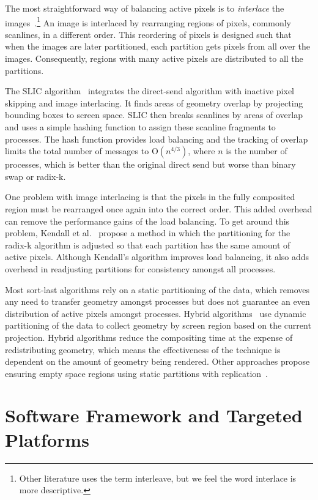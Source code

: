\documentclass{sig-alternate}
\newcommand*{\lcite}[1]{~\cite{#1}}
\newcommand*{\scite}[1]{~\cite{#1}}
\newcommand{\etal}{et al.}
\newcommand*{\keyterm}[1]{\emph{#1}}
\newcommand{\Oh}{\mathrm{O}}
\begin{document}
The most straightforward way of balancing active pixels is to
\keyterm{interlace} the
images\lcite{Molnar1994,Takeuchi2003}.\footnote{Other literature uses the
  term interleave, but we feel the word interlace is more descriptive.}  An
image is interlaced by rearranging regions of pixels, commonly scanlines,
in a different order.  This reordering of pixels is designed such that when
the images are later partitioned, each partition gets pixels from all over
the images.  Consequently, regions with many active pixels are distributed
to all the partitions.

The SLIC algorithm\lcite{SLIC} integrates the direct-send algorithm with
inactive pixel skipping and image interlacing.  It finds areas of geometry
overlap by projecting bounding boxes to screen space.  SLIC then breaks
scanlines by areas of overlap and uses a simple hashing function to assign
these scanline fragments to processes.  The hash function provides load
balancing and the tracking of overlap limits the total number of messages
to $\Oh(n^{4/3})$, where $n$ is the number of processes, which is better
than the original direct send but worse than binary swap or radix-k.

One problem with image interlacing is that the pixels in the fully
composited region must be rearranged once again into the correct order.
This added overhead can remove the performance gains of the load balancing.
To get around this problem, Kendall \etal\scite{Kendall2010} propose a
method in which the partitioning for the radix-k algorithm is adjusted so
that each partition has the same amount of active pixels.  Although
Kendall's algorithm improves load balancing, it also adds overhead in
readjusting partitions for consistency amongst all processes.

Most sort-last algorithms rely on a static partitioning of the data, which
removes any need to transfer geometry amongst processes but does not
guarantee an even distribution of active pixels amongst processes.  Hybrid
algorithms\lcite{Samanta2000} use dynamic partitioning of the data to
collect geometry by screen region based on the current projection.  Hybrid
algorithms reduce the compositing time at the expense of redistributing
geometry, which means the effectiveness of the technique is dependent on
the amount of geometry being rendered.  Other approaches propose ensuring
empty space regions using static partitions with
replication\lcite{Samanta2001}.

\section{Software Framework and Targeted Platforms}
\label{sec:TestingEnvironment}
\end{document}
